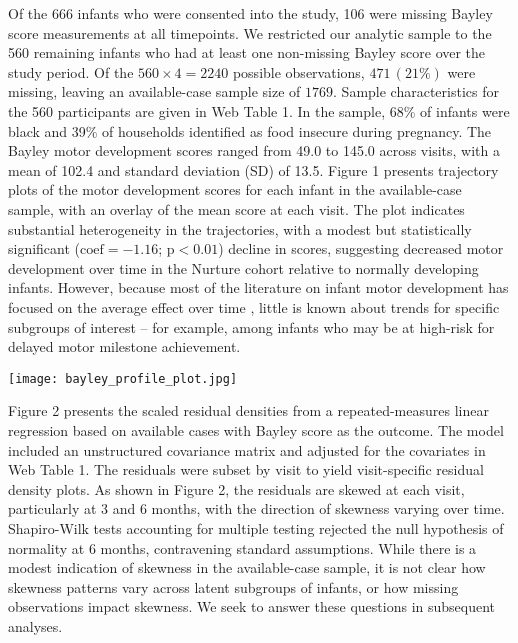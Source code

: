 \documentclass[useAMS,usenatbib,referee]{biom}
\let\origfigure\figure
\let\endorigfigure\endfigure
\renewenvironment{figure}[1][2] {
    \expandafter\origfigure\expandafter[H]
} {
    \endorigfigure
}
\begin{document}
Of the 666 infants who were consented into the study, 106 were missing Bayley score measurements at all timepoints. We restricted our analytic sample to the 560 remaining infants who had at least one non-missing Bayley score over the study period. Of the $560\times 4=2240$ possible observations, $471\, (21\%)$ were missing, leaving an available-case sample size of $1769$. Sample characteristics for the 560 participants are given in Web Table 1. In the sample, 68\% of infants were black and 39\% of households identified as food insecure during pregnancy. The Bayley motor development scores ranged from 49.0 to 145.0 across visits, with a mean of 102.4 and standard deviation (SD) of 13.5. {Figure 1} presents trajectory plots of the motor development scores for each infant in the available-case sample, with an overlay of the mean score at each visit. The plot indicates substantial heterogeneity in the trajectories, with a modest but statistically significant ($\text{coef} = -1.16$; $\text{p} < 0.01$) decline in scores, suggesting decreased motor development over time in the Nurture cohort relative to normally developing infants. However, because most of the literature on infant motor development has focused on the average effect over time \citep{shoaibi2019longitudinal}, little is known about trends for specific subgroups of interest -- for example, among infants who may be at high-risk for delayed motor milestone achievement.

\begin{figure}[h]
\caption{\label{fig:bayley_profiles} Longitudinal profile plot of infant development trajectories, with mean Bayley motor development score shown in black. Plot is based on the $N=1769$ available measurements for $n=560$ infants.}
\texttt{[image: bayley\_profile\_plot.jpg]}
\end{figure}

{Figure 2} presents the scaled residual densities from a repeated-measures linear regression based on available cases with Bayley score as the outcome. The model included an unstructured covariance matrix and adjusted for the covariates in Web Table 1. The residuals were subset by visit to yield visit-specific residual density plots. As shown in {Figure 2}, the residuals are skewed at each visit, particularly at 3 and 6 months, with the direction of skewness varying over time. Shapiro-Wilk tests accounting for multiple testing rejected the null hypothesis of normality at 6 months, contravening standard assumptions. While there is a modest indication of skewness in the available-case sample, it is not clear how skewness patterns vary across latent subgroups of infants, or how missing observations impact skewness. We seek to answer these questions in subsequent analyses.
\end{document}
